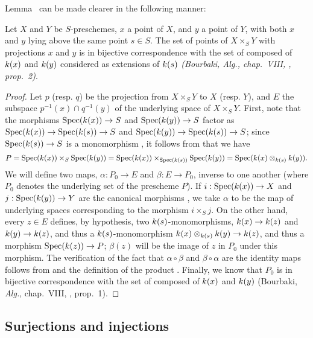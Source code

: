 Lemma~ can be made clearer in the following manner:
\begin{prop}[3.4.9]
\label{1.3.4.9}
Let $X$ and $Y$ be $S$-preschemes, $x$ a point of $X$, and $y$ a point of $Y$, with both $x$ and $y$ lying above the same point $s\in S$.
The set of points of $X\times_S Y$ with projections $x$ and $y$ is in bijective correspondence with the set of  composed of $k(x)$ and $k(y)$ considered as extensions of $k(s)$ \emph{(Bourbaki, \emph{Alg.}, chap.~VIII, , prop.~2)}.
\end{prop}

\begin{proof}
\label{proof-1.3.4.9}
Let $p$ (resp. $q$) be the projection from $X\times_S Y$ to $X$ (resp. $Y$), and $E$ the subspace $p^{-1}(x)\cap q^{-1}(y)$ of the underlying space of $X\times_S Y$.
First, note that the morphisms $\Spec(\kres(x))\to S$ and $\Spec(\kres(y))\to S$ factor as $\Spec(\kres(x))\to\Spec(\kres(s))\to S$ and $\Spec(\kres(y))\to\Spec(\kres(s))\to S$; since $\Spec(\kres(s))\to S$ is a monomorphism , it follows from  that we have
\[
  P={\mathop{\mathrm{Spec}}\nolimits}(k(x))\times_S{\mathop{\mathrm{Spec}}\nolimits}(k(y))={\mathop{\mathrm{Spec}}\nolimits}(k(x))\times_{{\mathop{\mathrm{Spec}}\nolimits}(k(s))}{\mathop{\mathrm{Spec}}\nolimits}(k(y))={\mathop{\mathrm{Spec}}\nolimits}(k(x)\otimes_{k(s)}k(y)).
\]
We will define two maps, $\alpha:P_0\to E$ and $\beta:E\to P_0$, inverse to one another (where $P_0$ denotes the underlying set of the prescheme $P$).
If $i:\Spec(\kres(x))\to X$ and $j:\Spec(\kres(y))\to Y$ are the canonical morphisms , we take $\alpha$ to be the map of underlying spaces corresponding to the morphism $i\times_S j$.
On the other hand, every $z\in E$ defines, by hypothesis, two $k(s)$-monomorphisms, $\kres(x)\to\kres(z)$ and $\kres(y)\to\kres(z)$, and thus a $k(s)$-monomorphism $\kres(x)\otimes_{\kres(s)}\kres(y)\to\kres(z)$, and thus a morphism $\Spec(\kres(z))\to P$; $\beta(z)$ will be the image of $z$ in $P_0$ under this morphism.
The verification of the fact that $\alpha\circ\beta$ and $\beta\circ\alpha$ are the identity maps follows from  and the definition of the product .
Finally, we know that $P_0$ is in bijective correspondence with the set of  composed of $k(x)$ and $k(y)$ (Bourbaki, \emph{Alg.}, chap.~VIII, , prop.~1).
\end{proof}

\subsection{Surjections and injections}
\label{subsection:surjections-and-injections}

